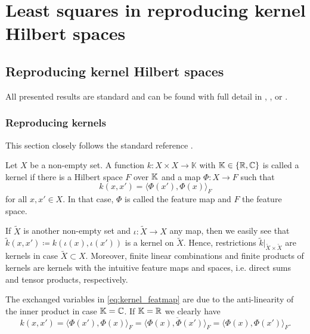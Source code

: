 \chapter{Least squares in reproducing kernel Hilbert spaces}

\section{Reproducing kernel Hilbert spaces}
\label{section:rkhs}

All presented results are standard and can be found with full 
detail in \cite[Chapters 4 and 5]{steinwart}, 
\cite[Chapter 1]{berlinet}, or \cite[Chapter 6 and 10]{wendland}.

\subsection{Reproducing kernels}

This section closely follows the standard reference 
\cite[Chapter 4]{steinwart}.

\begin{defn}
    Let $X$ be a non-empty set.
    A function $k \colon X \times X \to \mathbb K$
    with $\mathbb{K} \in \{ \mathbb{R}, \mathbb{C} \}$
    is called a kernel 
    if there is a Hilbert space $F$ over $\mathbb{K}$ 
    and a map $\Phi \colon X \to F$ such that
    \begin{equation} \label{eq:kernel_featmap}
        k(x,x') = \langle \Phi(x'), \Phi(x) \rangle_F
    \end{equation}
    for all $x,x' \in X$.
    In that case, $\Phi$ is called the feature map
    and $F$ the feature space.
\end{defn}

If $\tilde X$ is another non-empty set and $\iota \colon \tilde X \to X$ 
any map, then we easily see that 
$\tilde k(x,x') \coloneqq k(\iota(x), \iota(x'))$ 
is a kernel on $\tilde X$.
Hence, restrictions $\tilde k |_{\tilde X \times \tilde X}$
are kernels in case $\tilde X \subset X$.
Moreover, finite linear combinations and finite products of kernels
are kernels with the intuitive feature maps and spaces, i.e. direct
sums and tensor products, respectively.

The exchanged variables in \cref{eq:kernel_featmap} are due to the 
anti-linearity of the inner product in case $\mathbb{K} = \mathbb{C}$.
If $\mathbb{K} = \mathbb{R}$ we clearly have 
\begin{equation*}
    k(x,x') = \langle \Phi(x'), \Phi(x) \rangle_F 
    = \overline{\langle \Phi(x), \Phi(x') \rangle_F}
    = \langle \Phi(x), \Phi(x') \rangle_F.
\end{equation*}

